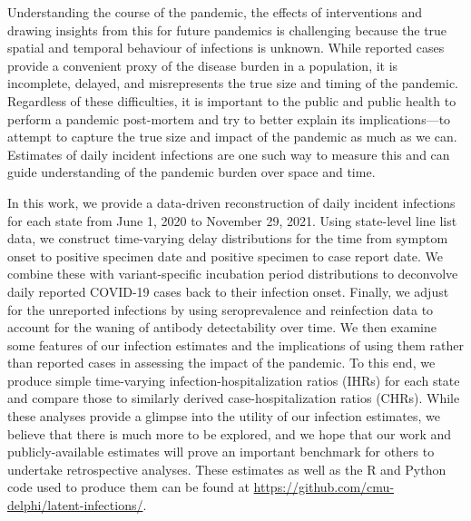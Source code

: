 Understanding the course of the pandemic, the effects of interventions and drawing 
insights from this for future pandemics is challenging because the true spatial 
and temporal behaviour of infections is unknown.
While reported cases provide a convenient proxy of the
disease burden in a population, it is incomplete, delayed, and
misrepresents the true size and timing of the pandemic. 
Regardless of these difficulties, it is important to
the public and public health to perform a pandemic post-mortem and try to better
explain its implications---to attempt to capture the true size and impact of the
pandemic as much as we can. Estimates of daily incident infections are one such
way to measure this and can guide understanding of the pandemic burden over
space and time. 

In this work, we provide a data-driven reconstruction of
daily incident infections for each \US state from June 1, 2020 to November 29,
2021. Using state-level line list data, we construct time-varying delay
distributions for the time from symptom onset to positive specimen date and
positive specimen to case report date. We combine these with variant-specific
incubation period distributions to deconvolve daily reported COVID-19 cases back
to their infection onset. Finally, we adjust for the unreported infections 
by using seroprevalence and reinfection data to account for the 
waning of antibody detectability over time. We then
examine some features of our infection estimates and the implications of using
them rather than reported cases in assessing the impact of the pandemic. To this end,
we produce simple time-varying infection-hospitalization ratios (IHRs) for each
state and compare those to similarly derived case-hospitalization ratios (CHRs).
While these analyses provide a glimpse into the utility of our infection
estimates, we believe that there is much more to be explored, and we hope that
our work and publicly-available estimates will prove an
important benchmark for others to undertake retrospective analyses. These estimates
as well as the R and Python code used to produce them can be found at
\href{https://github.com/cmu-delphi/latent-infections/}{https://github.com/cmu-delphi/latent-infections/}.

